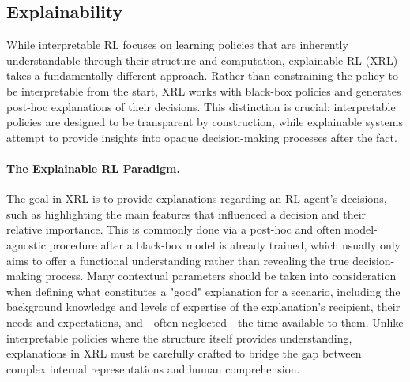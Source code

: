 \subsection{Explainability}
While interpretable RL focuses on learning policies that are inherently understandable through their structure and computation, explainable RL (XRL) takes a fundamentally different approach. Rather than constraining the policy to be interpretable from the start, XRL works with black-box policies and generates post-hoc explanations of their decisions. This distinction is crucial: interpretable policies are designed to be transparent by construction, while explainable systems attempt to provide insights into opaque decision-making processes after the fact.

\paragraph{The Explainable RL Paradigm.}
The goal in XRL is to provide explanations regarding an RL agent's decisions, such as highlighting the main features that influenced a decision and their relative importance. This is commonly done via a post-hoc and often model-agnostic procedure after a black-box model is already trained, which usually only aims to offer a functional understanding rather than revealing the true decision-making process.
Many contextual parameters should be taken into consideration when defining what constitutes a "good" explanation for a scenario, including the background knowledge and levels of expertise of the explanation's recipient, their needs and expectations, and—often neglected—the time available to them. Unlike interpretable policies where the structure itself provides understanding, explanations in XRL must be carefully crafted to bridge the gap between complex internal representations and human comprehension.

